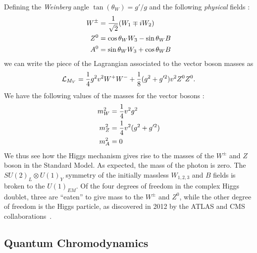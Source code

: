 Defining the \textit{Weinberg} angle $\tan(\theta_W) = g'/g$ and the following \textit{physical} fields :
\begin{align}
W^{\pm} &= \frac{1}{\sqrt{2}}(W_1 \mp iW_2) \\
Z^0 &= \cos \theta_W W_3 - \sin\theta_W B \notag\\
A^0 &= \sin \theta_W W_3 + \cos\theta_W B \notag
\end{align}
we can write the piece of the Lagrangian associated to the vector boson masses as
\begin{equation}
\mathcal{L}_{M_V} = \frac{1}{4} g^2 v^2 W^+ W^- + \frac{1}{8} (g^2 + g'^2)v^2 Z^0 Z^0 .
\end{equation}
We have the following values of the masses for the vector bosons :
\begin{align}
m_W^2 &= \frac{1}{4}  v^2 g^2  \\
m_Z^2 &= \frac{1}{4}  v^2 (g^2 + g'^2)  \notag \\
m_A^2 &= 0  \notag
\end{align}
We thus see how the Higgs mechanism gives rise to the masses of the $W^{\pm}$ and $Z$ boson in the Standard Model.
As expected, the mass of the photon is zero.
The $SU(2)_L \otimes U(1)_Y$ symmetry of the initially massless $W_{1,2,3}$ and $B$ fields is broken to the $U(1)_{EM}$.
Of the four degrees of freedom in the complex Higgs doublet, three are ``eaten'' to give mass to the $W^\pm$ and $Z^0$, while the other degree of freedom is the Higgs particle, as discovered in 2012 by the ATLAS and CMS collaborations~\cite{HIGG-2012-27, CMS-HIG-12-028}.

\subsection{Quantum Chromodynamics}

